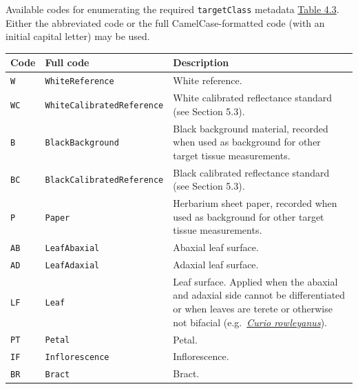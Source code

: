 \documentclass[
  letterpaper,
  DIV=11,
  numbers=noendperiod]{scrreprt}
\begin{document}
Available codes for enumerating the required \texttt{targetClass}
metadata \hyperref[tbl-4-3]{Table 4.3}. Either the abbreviated code or
the full CamelCase-formatted code (with an initial capital letter) may
be used.

\begin{longtable}[]{@{}
  >{\raggedright\arraybackslash}p{}
  >{\raggedright\arraybackslash}p{}
  >{\raggedright\arraybackslash}p{}@{}}
\toprule\noalign{}
\begin{minipage}[b]{\linewidth}\raggedright
Code
\end{minipage} & \begin{minipage}[b]{\linewidth}\raggedright
Full code
\end{minipage} & \begin{minipage}[b]{\linewidth}\raggedright
Description
\end{minipage} \\
\midrule\noalign{}
\endhead
\bottomrule\noalign{}
\endlastfoot
\texttt{W} & \texttt{WhiteReference} & White reference. \\
\texttt{WC} & \texttt{WhiteCalibratedReference} & White calibrated
reflectance standard (see Section 5.3). \\
\texttt{B} & \texttt{BlackBackground} & Black background material,
recorded when used as background for other target tissue
measurements. \\
\texttt{BC} & \texttt{BlackCalibratedReference} & Black calibrated
reflectance standard (see Section 5.3). \\
\texttt{P} & \texttt{Paper} & Herbarium sheet paper, recorded when used
as background for other target tissue measurements. \\
\texttt{AB} & \texttt{LeafAbaxial} & Abaxial leaf surface. \\
\texttt{AD} & \texttt{LeafAdaxial} & Adaxial leaf surface. \\
\texttt{LF} & \texttt{Leaf} & Leaf surface. Applied when the abaxial and
adaxial side cannot be differentiated or when leaves are terete or
otherwise not bifacial
(e.g.~\href{https://powo.science.kew.org/taxon/urn:lsid:ipni.org:names:1011412-1}{\emph{Curio
rowleyanus}}). \\
\texttt{PT} & \texttt{Petal} & Petal. \\
\texttt{IF} & \texttt{Inflorescence} & Inflorescence. \\
\texttt{BR} & \texttt{Bract} & Bract. \\

\end{longtable}
\end{document}
